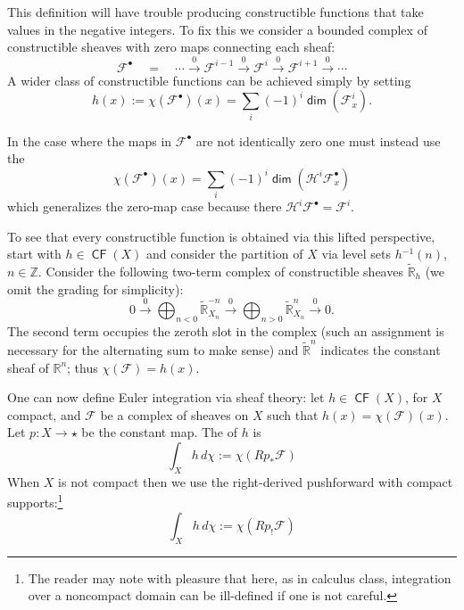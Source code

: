 \documentclass{psapm-l}
\theoremstyle{definition}
\theoremstyle{remark}
\numberwithin{equation}{section}
\begin{document}
This definition will have trouble producing constructible functions that take values in the negative integers. To fix this we consider a bounded complex of constructible sheaves with zero maps connecting each sheaf:
\[
    {{\mathcal F}}^{\bullet}\quad =\quad \cdots
    \stackrel{0}{\longrightarrow}{{\mathcal F}}^{i-1}
    \stackrel{0}{\longrightarrow}{{\mathcal F}}^i
    \stackrel{0}{\longrightarrow}{{\mathcal F}}^{i+1}
    \stackrel{0}{\longrightarrow}\cdots
\]
A wider class of constructible functions can be achieved simply by setting
\[
	h(x):=\chi({{\mathcal F}}^{\bullet})(x)=\sum_i (-1)^i{{{\operatorname{\mathsf{{dim}}}}}} ({{\mathcal F}}^i_x).
\]

In the case where the maps in ${{\mathcal F}}^{\bullet}$ are not identically zero one must instead use the {{}}
\[
	\chi({{\mathcal F}}^{\bullet})(x)=\sum_i (-1)^i{{{\operatorname{\mathsf{{dim}}}}}}(\mathcal{H}^i{{\mathcal F}}^{\bullet}_x)
\]
which generalizes the zero-map case because there $\mathcal{H}^i{{\mathcal F}}^{\bullet}={{\mathcal F}}^i$.

To see that every constructible function is obtained via this lifted perspective, start with $h\in{{{\operatorname{\mathsf{{CF}}}}}}(X)$ and consider the partition of $X$ via level sets $h{^{-1}}(n)$, $n\in{{\mathbb Z}}$. Consider the following two-term complex of constructible sheaves $\widetilde{{\mathbb R}}_h$ (we omit the grading for simplicity):
\begin{equation}\label{sheaf-fn}
	0
	\stackrel{0}{\longrightarrow}\bigoplus_{n<0}\widetilde{{\mathbb R}}_{X_n}^{-n}
    \stackrel{0}{\longrightarrow}\bigoplus_{n>0}\widetilde{{\mathbb R}}_{X_n}^{n}
	\stackrel{0}{\longrightarrow}
	0 .
\end{equation}
The second term occupies the zeroth slot in the complex (such an assignment is necessary for the alternating sum to make sense) and $\widetilde{{\mathbb R}}^n$ indicates the constant sheaf of ${{\mathbb R}}^n$; thus $\chi({{\mathcal F}})=h(x)$.

One can now define Euler integration via sheaf theory: let $h\in{{{\operatorname{\mathsf{{CF}}}}}}(X)$, for $X$ compact, and ${{\mathcal F}}$ be a complex of sheaves on $X$ such that $h(x)=\chi({{\mathcal F}})(x)$. Let $p\colon X\to\star$ be the constant map. The {{}} of $h$ is
\begin{equation}
		\int_X h\,d\chi:=\chi(Rp_*{{\mathcal F}})
\end{equation}
When $X$ is not compact then we use the right-derived pushforward with compact supports:\footnote{The reader may note with pleasure that here, as in calculus class, integration over a noncompact domain can be ill-defined if one is not careful.}
\begin{equation}
               \int_X h\,d\chi:=\chi(Rp_!{{\mathcal F}})
\end{equation}
\end{document}

